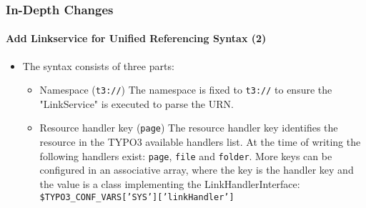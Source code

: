 \begin{frame}[fragile]
	\frametitle{In-Depth Changes}
	\framesubtitle{Add Linkservice for Unified Referencing Syntax (2)}

	\begin{itemize}

		\item The syntax consists of three parts:

			\begin{itemize}

				\item Namespace (\texttt{t3://})\newline
		   			The namespace is fixed to \texttt{t3://} to ensure the "LinkService" is executed to parse the URN.
					\newline
				\item Resource handler key (\texttt{page})\newline
   					The resource handler key identifies the resource in the TYPO3 available handlers list.
					At the time of writing the following handlers exist: \texttt{page}, \texttt{file} and \texttt{folder}.\newline
					More keys can be configured in an associative array, where the key is the handler key and the value
					is a class implementing the LinkHandlerInterface:\newline
					\texttt{\$TYPO3\_CONF\_VARS['SYS']['linkHandler']}

			\end{itemize}

	\end{itemize}

\end{frame}

